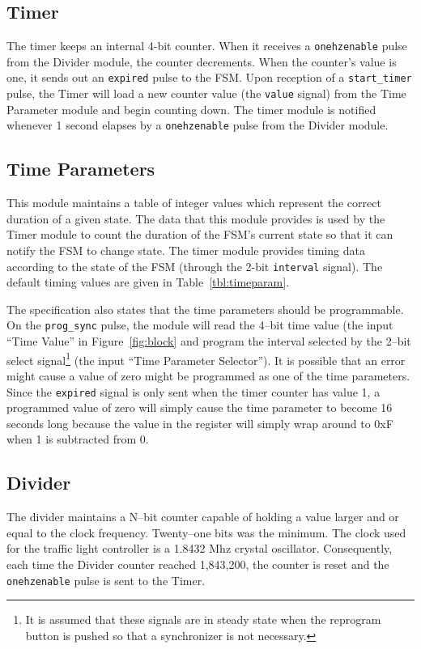 \documentclass[11]{article}
\begin{document}
	\subsection{Timer}
	The timer keeps an internal 4-bit counter.  When it receives a
	\texttt{onehzenable} pulse from the Divider module, the counter decrements.
	When the counter's value is one, it sends out an {\texttt{expired}}
	pulse to the FSM.  Upon reception of a \texttt{start\_timer}
	pulse, the Timer will load a new counter value (the \texttt{value}
	signal) from the Time Parameter module and begin counting down.  The
	timer module is notified whenever 1 second elapses by a
	\texttt{onehzenable} pulse from the Divider module.

	\subsection{Time Parameters}
	This module maintains a table of integer values which represent
	the correct duration of a given state.  The data that this module
	provides is used by the Timer module to count the duration of the FSM's
	current state so that it can notify the FSM to change state.  The timer
	module provides timing data according to the state of the FSM (through
	the 2-bit \texttt{interval} signal).  The default timing values are
	given in Table~\ref{tbl:timeparam}.

	The specification also states that the time parameters should be
	programmable.  On the \texttt{prog\_sync} pulse, the module will read
	the 4--bit time value (the input ``Time Value'' in
	Figure~\ref{fig:block} and program the interval selected by the 2--bit
	select signal\footnote{It is assumed that these signals are in steady
	state when the reprogram button is pushed so that a synchronizer is not
	necessary.} (the input ``Time Parameter Selector'').  It is possible
	that an error might cause a value of zero might be programmed as one of
	the time parameters.  Since the \texttt{expired} signal is only sent
	when the timer counter has value 1, a programmed value of zero will
	simply cause the time parameter to become 16 seconds long because the
	value in the register will simply wrap around to 0xF when 1 is
	subtracted from 0.

	\subsection{Divider}
	The divider maintains a N--bit counter capable of holding a
	value larger and or equal to the clock frequency. Twenty--one bits was the
	minimum.  The clock used for the traffic light controller is a 1.8432 Mhz
	crystal oscillator.  Consequently, each time the Divider counter reached
	1,843,200, the counter is reset and the \texttt{onehzenable} pulse is sent
	to the Timer.
\end{document}
